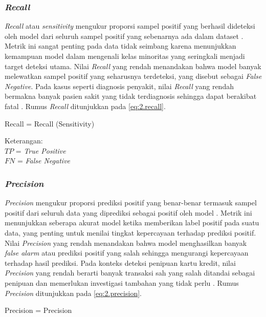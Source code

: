 \subsubsection{\textit{Recall}} \label{II.recall}
\textit{Recall} atau \textit{sensitivity} mengukur proporsi sampel positif yang berhasil dideteksi oleh model dari seluruh sampel positif yang sebenarnya ada dalam dataset \cite{Luque2019Metrics}. Metrik ini sangat penting pada data tidak seimbang karena menunjukkan kemampuan model dalam mengenali kelas minoritas yang seringkali menjadi target deteksi utama. Nilai \textit{Recall} yang rendah menandakan bahwa model banyak melewatkan sampel positif yang seharusnya terdeteksi, yang disebut sebagai \textit{False Negative}. Pada kasus seperti diagnosis penyakit, nilai \textit{Recall} yang rendah bermakna banyak pasien sakit yang tidak terdiagnosis sehingga dapat berakibat fatal \cite{Fawcett2006ROC, Sokolova2009Metrics}. Rumus \textit{Recall} ditunjukkan pada \ref{eq:2.recall}.

\begin{equationcaptioned}[eq:2.recall]{
    Recall = 
}{
    Recall (Sensitivity)
}
\end{equationcaptioned}

Keterangan: \\
$TP$ = \textit{True Positive} \\
$FN$ = \textit{False Negative}
\subsubsection{\textit{Precision}} \label{II.precision}
\textit{Precision} mengukur proporsi prediksi positif yang benar-benar termasuk sampel positif dari seluruh data yang diprediksi sebagai positif oleh model \cite{Luque2019Metrics}. Metrik ini menunjukkan seberapa akurat model ketika memberikan label positif pada suatu data, yang penting untuk menilai tingkat kepercayaan terhadap prediksi positif. Nilai \textit{Precision} yang rendah menandakan bahwa model menghasilkan banyak \textit{false alarm} atau prediksi positif yang salah sehingga mengurangi kepercayaan terhadap hasil prediksi. Pada konteks deteksi penipuan kartu kredit, nilai \textit{Precision} yang rendah berarti banyak transaksi sah yang salah ditandai sebagai penipuan dan memerlukan investigasi tambahan yang tidak perlu \cite{Sokolova2009Metrics, Grandini2020Metrics}. Rumus \textit{Precision} ditunjukkan pada \ref{eq:2.precision}.

\begin{equationcaptioned}[eq:2.precision]{
    Precision = 
}{
    Precision
}
\end{equationcaptioned}

